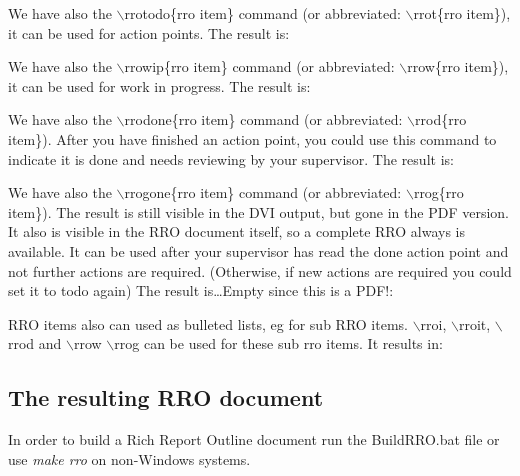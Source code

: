 We have also the $\backslash$rrotodo\{rro item\} command (or abbreviated:
$\backslash$rrot\{rro item\}), it can be used for action points. The result
is:\par
{}

We have also the $\backslash$rrowip\{rro item\} command (or abbreviated:
$\backslash$rrow\{rro item\}), it can be used for work in progress. The result
is:\par
{}

We have also the $\backslash$rrodone\{rro item\} command (or abbreviated:
$\backslash$rrod\{rro item\}). After you have
finished an action point, you could use this command to indicate it is done and needs
reviewing by your supervisor. The result is:\par
{}

We have also the $\backslash$rrogone\{rro item\} command (or abbreviated:
$\backslash$rrog\{rro item\}). The result is still
visible in the DVI output, but gone in the PDF version. It also is visible in
the RRO document itself, so a complete RRO always is available. It can be used
after your supervisor has read the done action point and not further actions
are required. (Otherwise, if new actions are required you could set it to todo 
again) The result is\ifpdf\ldots Empty since this is a PDF!\else :\par\fi
{}

RRO items also can used as bulleted lists, eg for sub RRO items. 
$\backslash$rroi, $\backslash$rroit, $\backslash$rrod and $\backslash$rrow $\backslash$rrog can
be used for these sub rro items. It results in:


\subsection{The resulting RRO document}
In order to build a Rich Report Outline document run the BuildRRO.bat file or
use \textit{make rro} on non-Windows systems.

